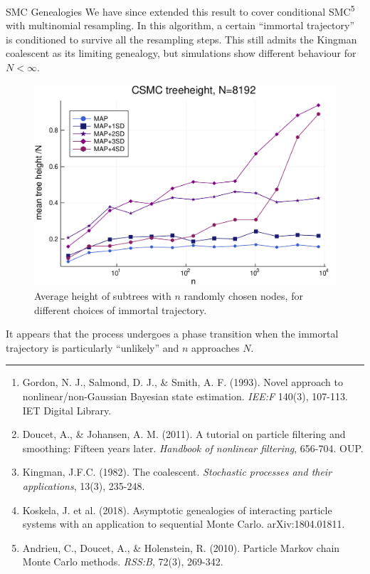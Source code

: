 \documentclass[final, 12pt]{beamer}
\newlength{\colwidth}
\begin{document}
\begin{frame}
\begin{columns}
\begin{column}{\colwidth}
\begin{block}{SMC Genealogies}
We have since extended this result to cover conditional SMC\textsuperscript{5} with multinomial resampling. In this algorithm, a certain ``immortal trajectory'' is conditioned to survive all the resampling steps. This still admits the Kingman coalescent as its limiting genealogy, but simulations show different behaviour for $N<\infty$.\\[10pt]
\begin{figure}
\includegraphics[width=0.9\colwidth]{../CSMC_treeheight_500reps.pdf}
\caption{Average height of subtrees with $n$ randomly chosen nodes, for different choices of immortal trajectory.}
\end{figure}
It appears that the process undergoes a phase transition when the immortal trajectory is particularly ``unlikely'' and $n$ approaches $N$.
\end{block}

\vspace*{20pt}
\hrule
\begin{block}

\vspace*{-30pt}

\small{
\begin{enumerate}
\item Gordon, N. J., Salmond, D. J., \& Smith, A. F. (1993). Novel approach to nonlinear/non-Gaussian Bayesian state estimation. \textit{IEE:F} 140(3), 107-113. IET Digital Library.
\item Doucet, A., \& Johansen, A. M. (2011). A tutorial on particle filtering and smoothing: Fifteen years later. \textit{Handbook of nonlinear filtering}, 656-704. OUP.
\item Kingman, J.F.C. (1982). The coalescent. \textit{Stochastic processes and their applications}, 13(3), 235-248.
\item Koskela, J. et al. (2018).  Asymptotic genealogies of interacting particle systems with an application to sequential Monte Carlo. arXiv:1804.01811.
\item Andrieu, C., Doucet, A., \& Holenstein, R. (2010). Particle Markov chain Monte Carlo methods. \textit{RSS:B}, 72(3), 269-342.
\end{enumerate}
}
\end{block}


\end{column}
\end{columns}
\end{frame}
\end{document}
